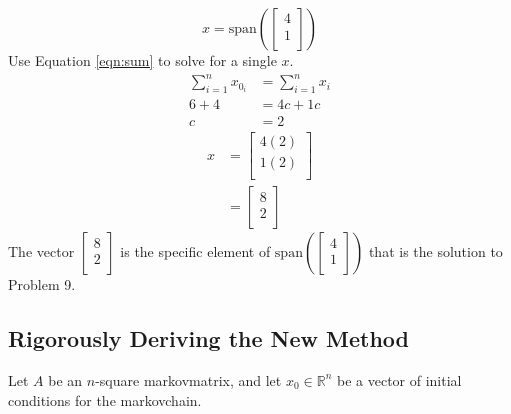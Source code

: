 \documentclass[titlepage]{article}
\newcommand{\spn}[1]{\text{span}\left( #1 \right)}
\begin{document}
\begin{equation*}
    x = \spn{
        \begin{bmatrix}
            4\\
            1\\
        \end{bmatrix}
    }
\end{equation*}
Use Equation \ref{eqn:sum} to solve for a single $x$.
\begin{align*}
    \sum_{i=1}^n x_{0_i} &= \sum_{i=1}^n x_i\\
    6+4 &= 4c+1c\\
    c &= 2
\end{align*}
\begin{align*}
    x &=
    \begin{bmatrix}
        4(2)\\
        1(2)\\
    \end{bmatrix}\\
    &=
    \begin{bmatrix}
        8\\
        2\\
    \end{bmatrix}
\end{align*}
The vector $
    \begin{bmatrix}
        8\\
        2\\
    \end{bmatrix}
$ is the specific element of $
    \spn{
        \begin{bmatrix}
            4\\
            1\\
        \end{bmatrix}
    }
$ that is the solution to Problem 9.


\subsection{Rigorously Deriving the New Method}\label{sss:rigorous}
Let $A$ be an $n$-square \Gls{markovmatrix}, and let $x_0\in\mathbb{R}^n$ be a vector of initial conditions for the \Gls{markovchain}.
\end{document}
